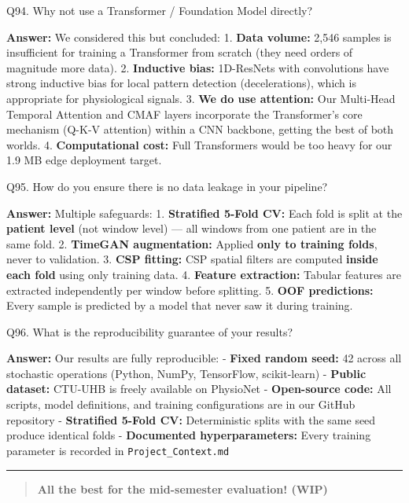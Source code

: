 \documentclass[11pt,a4paper]{article}
\begin{document}
\begin{questionbox}
Q94. Why not use a Transformer / Foundation Model directly?
\end{questionbox}
\textbf{Answer:} We considered this but concluded: 1. \textbf{Data volume:}
2,546 samples is insufficient for training a Transformer from scratch
(they need orders of magnitude more data). 2. \textbf{Inductive bias:}
1D-ResNets with convolutions have strong inductive bias for local
pattern detection (decelerations), which is appropriate for
physiological signals. 3. \textbf{We do use attention:} Our Multi-Head
Temporal Attention and CMAF layers incorporate the Transformer's core
mechanism (Q-K-V attention) within a CNN backbone, getting the best of
both worlds. 4. \textbf{Computational cost:} Full Transformers would be
too heavy for our 1.9 MB edge deployment target.

\begin{questionbox}
Q95. How do you ensure there is no data leakage in your
pipeline?
\end{questionbox}
\textbf{Answer:} Multiple safeguards: 1. \textbf{Stratified 5-Fold CV:} Each
fold is split at the \textbf{patient level} (not window level) --- all
windows from one patient are in the same fold. 2. \textbf{TimeGAN
augmentation:} Applied \textbf{only to training folds}, never to
validation. 3. \textbf{CSP fitting:} CSP spatial filters are computed
\textbf{inside each fold} using only training data. 4. \textbf{Feature
extraction:} Tabular features are extracted independently per window
before splitting. 5. \textbf{OOF predictions:} Every sample is predicted
by a model that never saw it during training.

\begin{questionbox}
Q96. What is the reproducibility guarantee of your results?
\end{questionbox}
\textbf{Answer:} Our results are fully reproducible: - \textbf{Fixed random
seed:} 42 across all stochastic operations (Python, NumPy, TensorFlow,
scikit-learn) - \textbf{Public dataset:} CTU-UHB is freely available on
PhysioNet - \textbf{Open-source code:} All scripts, model definitions,
and training configurations are in our GitHub repository -
\textbf{Stratified 5-Fold CV:} Deterministic splits with the same seed
produce identical folds - \textbf{Documented hyperparameters:} Every
training parameter is recorded in \texttt{Project\_Context.md}

\begin{center}\rule{0.5\linewidth}{0.5pt}\end{center}

\begin{quote}
\textbf{All the best for the mid-semester evaluation! (WIP)}
\end{quote}
\end{document}
